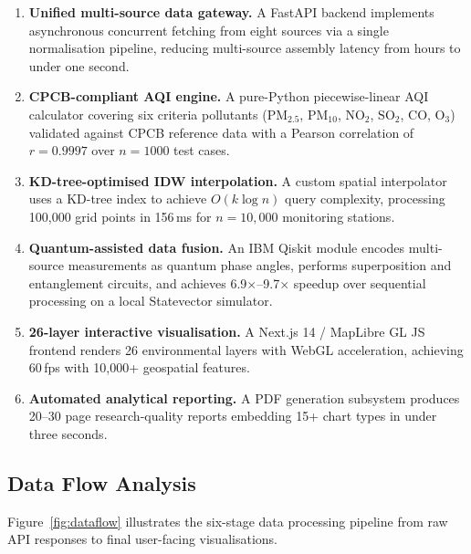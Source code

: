 \documentclass[12pt,a4paper]{article}
\begin{document}
\begin{enumerate}[leftmargin=*, label=\textbf{C\arabic*.}]

\item \textbf{Unified multi-source data gateway.} A FastAPI backend
      implements asynchronous concurrent fetching from eight sources via a
      single normalisation pipeline, reducing multi-source assembly latency from
      hours to under one second.

\item \textbf{CPCB-compliant AQI engine.} A pure-Python piecewise-linear AQI
      calculator covering six criteria pollutants
      ($\text{PM}_{2.5}$, $\text{PM}_{10}$, $\text{NO}_2$, $\text{SO}_2$,
      $\text{CO}$, $\text{O}_3$) validated against CPCB reference data with a
      Pearson correlation of $r = 0.9997$ over $n = 1000$ test cases.

\item \textbf{KD-tree-optimised IDW interpolation.} A custom spatial
      interpolator uses a KD-tree index to achieve $O(k \log n)$ query
      complexity, processing 100,000 grid points in 156\,ms for $n = 10{,}000$
      monitoring stations.

\item \textbf{Quantum-assisted data fusion.} An IBM Qiskit module encodes
      multi-source measurements as quantum phase angles, performs superposition
      and entanglement circuits, and achieves 6.9$\times$--9.7$\times$ speedup
      over sequential processing on a local Statevector simulator.

\item \textbf{26-layer interactive visualisation.} A Next.js 14 / MapLibre GL
      JS frontend renders 26 environmental layers with WebGL acceleration,
      achieving 60\,fps with 10,000+ geospatial features.

\item \textbf{Automated analytical reporting.} A PDF generation subsystem
      produces 20--30 page research-quality reports embedding 15+ chart types
      in under three seconds.

\end{enumerate}


\subsection{Data Flow Analysis}
\label{sec:sysdesign:dataflow}

Figure~\ref{fig:dataflow} illustrates the six-stage data processing pipeline
from raw API responses to final user-facing visualisations.
\end{document}
